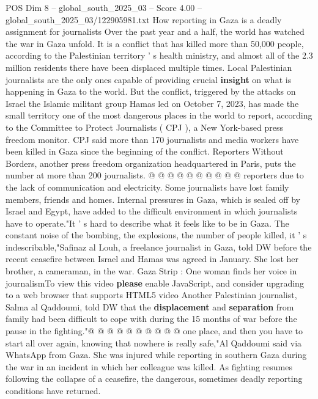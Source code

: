 \begin{textsample}{POS Dim 8 – global\_south\_2025\_03 – Score 4.00 – global\_south\_2025\_03/122905981.txt}  \label{ex:f8_pos_147}
How reporting in Gaza is a deadly assignment for journalists Over the past year and a half, the world has watched the war in Gaza unfold.
It is a conflict that has killed more than 50,000 people, according to the Palestinian territory ' s health ministry, and almost all of the 2.3 million residents there have been displaced multiple times.
Local Palestinian journalists are the only ones capable of providing crucial \textbf{insight} on what is happening in Gaza to the world.
But the conflict, triggered by the attacks on Israel the Islamic militant group Hamas led on October 7, 2023, has made the small territory one of the most dangerous places in the world to report, according to the Committee to Protect Journalists ( CPJ ), a New York-based press freedom monitor.
CPJ said more than 170 journalists and media workers have been killed in Gaza since the beginning of the conflict.
Reporters Without Borders, another press freedom organization headquartered in Paris, puts the number at more than 200 journalists. @ @ @ @ @ @ @ @ @ @ reporters due to the lack of communication and electricity.
Some journalists have lost family members, friends and homes.
Internal pressures in Gaza, which is sealed off by Israel and Egypt, have added to the difficult environment in which journalists have to operate."It ' s hard to describe what it feels like to be in Gaza.
The constant noise of the bombing, the explosions, the number of people killed, it ' s indescribable,"Safinaz al Louh, a freelance journalist in Gaza, told DW before the recent ceasefire between Israel and Hamas was agreed in January.
She lost her brother, a cameraman, in the war.
Gaza Strip : One woman finds her voice in journalismTo view this video \textbf{please} enable JavaScript, and consider upgrading to a web browser that supports HTML5 video Another Palestinian journalist, Salma al Qaddoumi, told DW that the \textbf{displacement} and \textbf{separation} from family had been difficult to cope with during the 15 months of war before the pause in the fighting."@ @ @ @ @ @ @ @ @ @ one place, and then you have to start all over again, knowing that nowhere is really safe,"Al Qaddoumi said via WhatsApp from Gaza.
She was injured while reporting in southern Gaza during the war in an incident in which her colleague was killed.
As fighting resumes following the collapse of a ceasefire, the dangerous, sometimes deadly reporting conditions have returned.

\end{textsample}
